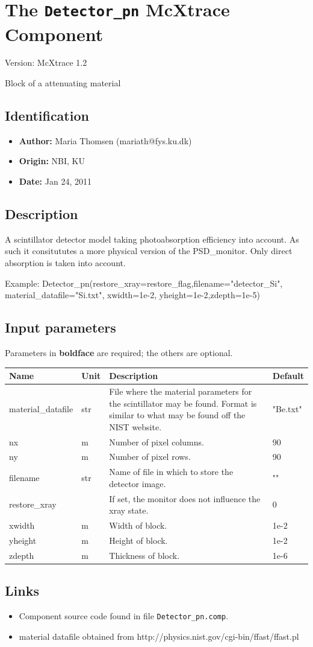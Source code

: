 \section{The \texttt{Detector\_pn} McXtrace Component}
Version: McXtrace 1.2

Block of a attenuating material

\subsection*{Identification}
\begin{itemize}
  \item \textbf{Author:} Maria Thomsen (mariath@fys.ku.dk)
  \item \textbf{Origin:} NBI, KU
  \item \textbf{Date:} Jan 24, 2011
\end{itemize}

\subsection*{Description}
A scintillator detector model taking photoabsorption efficiency into account. As such it consitututes a more physical version of the PSD\_monitor. Only direct absorption is taken into account.

Example: Detector\_pn(restore\_xray=restore\_flag,filename="detector\_Si", material\_datafile="Si.txt", xwidth=1e-2, yheight=1e-2,zdepth=1e-5)

\subsection*{Input parameters}
Parameters in \textbf{boldface} are required; the others are optional.

\begin{longtable}{p{}p{}p{}p{}}
\toprule
\textbf{Name} & \textbf{Unit} & \textbf{Description} & \textbf{Default} \\
\midrule
\endhead
material\_datafile & str & File where the material parameters for the scintillator may be found. Format is similar to what may be found off the NIST website. & "Be.txt" \\
nx & m & Number of pixel columns. & 90 \\
ny & m & Number of pixel rows. & 90 \\
filename & str & Name of file in which to store the detector image. & "" \\
restore\_xray &   & If set, the monitor does not influence the xray state. & 0 \\
xwidth & m & Width of block. & 1e-2 \\
yheight & m & Height of block. & 1e-2 \\
zdepth & m & Thickness of block. & 1e-6 \\
\bottomrule
\end{longtable}

\subsection*{Links}
\begin{itemize}
  \item Component source code found in file \texttt{Detector\_pn.comp}.
  \item material datafile obtained from http://physics.nist.gov/cgi-bin/ffast/ffast.pl
\end{itemize}
